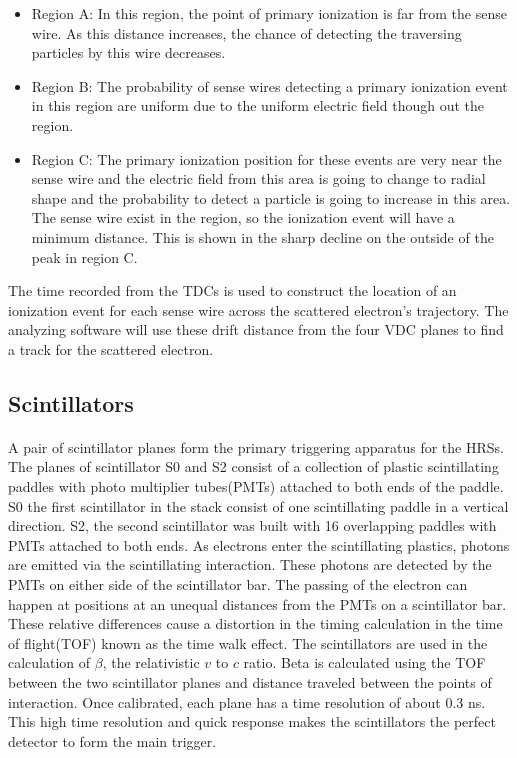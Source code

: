 	\begin{itemize}
		\item Region A: In this region, the point of primary ionization is far from the sense wire. As this distance increases, the chance of detecting the traversing particles by this wire decreases. 
		\item Region B: The probability of sense wires detecting a primary ionization event in this region are uniform due to the uniform electric field though out the region. 
		\item Region C: The primary ionization position for these events are very near the sense wire and the electric field from this area is going to change to radial shape and the 	probability to detect a particle is going to increase in this area. The sense wire exist in the region, so the ionization event will have a minimum distance. This is shown in the sharp decline on the outside of the peak in region C. 
		\cite{primer}
	\end{itemize}	
The time recorded from the TDCs is used to construct the location of an ionization event for each sense wire across the scattered electron's trajectory. The analyzing software will use these drift distance from the four VDC planes to find a track for the scattered electron.



	\subsection{Scintillators}\label{sec:scin}
	\paragraph{} A pair of scintillator planes form the primary triggering apparatus for the HRSs. The planes of scintillator S0 and S2 consist of a collection of plastic scintillating paddles with photo multiplier tubes(PMTs) attached to both ends of the paddle. S0 the first scintillator in the stack consist of one scintillating paddle in a vertical direction. S2, the second scintillator was built with 16 overlapping paddles with PMTs attached to both ends. As electrons enter the scintillating plastics, photons are emitted via the scintillating interaction. These photons are detected by the PMTs on either side of the scintillator bar. The passing of the electron can happen at positions at an unequal distances from the PMTs on a scintillator bar. These relative differences cause a distortion in the timing calculation in the time of flight(TOF) known as the time walk effect. The scintillators are used in the calculation of $\beta$, the relativistic $v$ to $c$ ratio. Beta is calculated using the TOF between the two scintillator planes and distance traveled between the points of interaction. 
	Once calibrated, each plane has a time resolution of about 0.3 ns. This high time resolution and quick response makes the scintillators the perfect detector to form the main trigger.  
	
